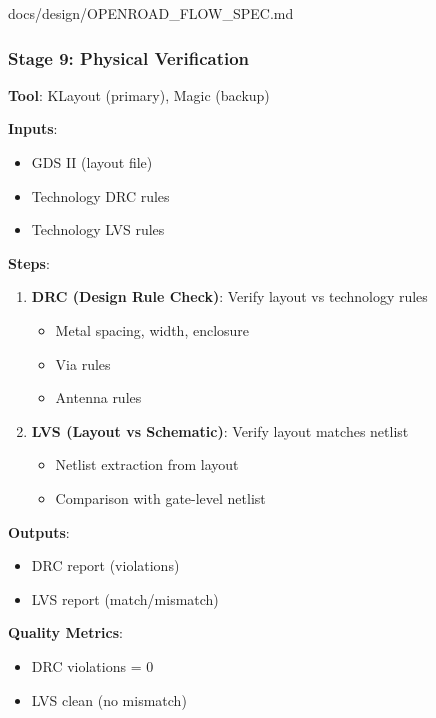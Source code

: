 \begin{relocated}{docs/design/OPENROAD_FLOW_SPEC.md}
\subsubsection{Stage 9: Physical Verification}\label{tm:pd:openroad-flow:stage-9-physical-verification}

\textbf{Tool}: KLayout (primary), Magic (backup)

\textbf{Inputs}:

\begin{itemize}
\tightlist
\item
  GDS II (layout file)
\item
  Technology DRC rules
\item
  Technology LVS rules
\end{itemize}

\textbf{Steps}:

\begin{enumerate}
\def\labelenumi{\arabic{enumi}.}
\tightlist
\item
  \textbf{DRC (Design Rule Check)}: Verify layout vs technology rules

  \begin{itemize}
  \tightlist
  \item
    Metal spacing, width, enclosure
  \item
    Via rules
  \item
    Antenna rules
  \end{itemize}
\item
  \textbf{LVS (Layout vs Schematic)}: Verify layout matches netlist

  \begin{itemize}
  \tightlist
  \item
    Netlist extraction from layout
  \item
    Comparison with gate-level netlist
  \end{itemize}
\end{enumerate}

\textbf{Outputs}:

\begin{itemize}
\tightlist
\item
  DRC report (violations)
\item
  LVS report (match/\allowbreak{}mismatch)
\end{itemize}

\textbf{Quality Metrics}:

\begin{itemize}
\tightlist
\item
  DRC violations = 0
\item
  LVS clean (no mismatch)
\end{itemize}


\end{relocated}
